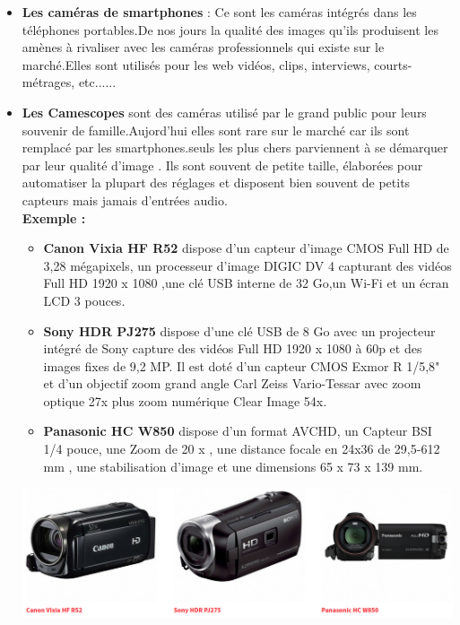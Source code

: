 \documentclass[12pt,a4paper]{report}
\begin{document}
\begin{itemize}
	\item \textbf{Les caméras de smartphones} : Ce sont les caméras intégrés dans les téléphones portables.De nos jours la qualité des images qu'ils produisent les amènes à rivaliser avec les caméras professionnels qui existe sur le marché.Elles sont utilisés pour les web vidéos, clips, interviews, courts-métrages, etc......\\
	
	\item \textbf{Les Camescopes} sont des caméras utilisé par le grand public pour leurs souvenir de famille.Aujord'hui elles sont rare sur le marché car ils sont remplacé par les smartphones.seuls les plus chers parviennent à se démarquer par leur qualité d’image . Ils sont souvent de petite taille, élaborées pour automatiser la plupart des réglages et disposent bien souvent de petits capteurs mais jamais d’entrées audio.\\
	
	\textbf{Exemple :\\}
	\begin{itemize}
		\item \textbf{Canon Vixia HF R52} dispose d'un capteur d'image CMOS Full HD de 3,28 mégapixels, un processeur d'image DIGIC DV 4 capturant des vidéos Full HD 1920 x 1080 ,une clé USB interne de 32 Go,un Wi-Fi et un écran LCD 3 pouces. \\
		\item \textbf{Sony HDR PJ275} dispose d'une clé USB de 8 Go avec un projecteur intégré de Sony capture des vidéos Full HD 1920 x 1080 à 60p et des images fixes de 9,2 MP. Il est doté d'un capteur CMOS Exmor R 1/5,8" et d'un objectif zoom grand angle Carl Zeiss Vario-Tessar avec zoom optique 27x plus zoom numérique Clear Image 54x.\\
		
		\item \textbf{Panasonic HC W850} dispose d'un format AVCHD, un Capteur BSI 1/4 pouce, une Zoom de 20 x , une distance focale en 24x36 	de 29,5-612 mm , une stabilisation d'image et une dimensions 	65 x 73 x 139 mm. \\		 
	\end{itemize}
		\includegraphics[scale=0.38]{image/camescopes.png} \\
		

\end{itemize}
\end{document}
